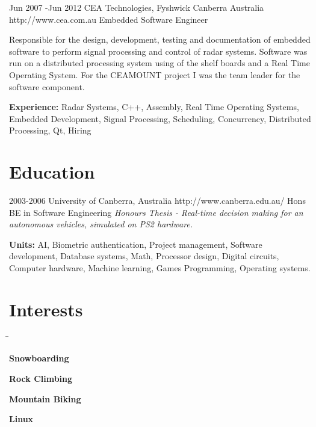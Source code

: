 \documentclass{article}
\begin{document}
\begin{job}
{Jun 2007 -}{Jun 2012}
{CEA Technologies, Fyshwick Canberra Australia}
{http://www.cea.com.au}
{Embedded Software Engineer}%
{Responsible for the design, development, testing and documentation of embedded software to perform signal processing and control of radar systems. Software was run on a distributed processing system using of the shelf boards and a Real Time Operating System. For the CEAMOUNT project I was the team leader for the software component.\\
\rule{0mm}{5mm}\textbf{Experience:} Radar Systems, C++, Assembly, Real Time Operating Systems, Embedded Development, Signal Processing, Scheduling, Concurrency, Distributed Processing, Qt, Hiring} 
\end{job}

\section*{Education}

\begin{education}
{2003-2006}
{University of Canberra, Australia} 
{http://www.canberra.edu.au/} 
{Hons BE in Software Engineering}%
\textit{Honours Thesis - Real-time decision making for an autonomous vehicles, simulated
on PS2 hardware.}\\
\rule{0mm}{5mm}\textbf{Units:} {AI, Biometric authentication, Project management, Software development, Database systems, Math, Processor design, Digital circuits, Computer hardware, Machine learning, Games Programming, Operating systems.} 
\end{education}

\section*{Interests}

\begin{tabbing}
\hspace{5mm} \= \kill
\rule{0mm}{4mm}\sqbullet \> \textbf{Snowboarding}\\
\rule{0mm}{4mm}\sqbullet \> \textbf{Rock Climbing} \\
\rule{0mm}{4mm}\sqbullet \> \textbf{Mountain Biking} \\
\rule{0mm}{4mm}\sqbullet \> \textbf{Linux} \\
\end{tabbing}
\end{document}
